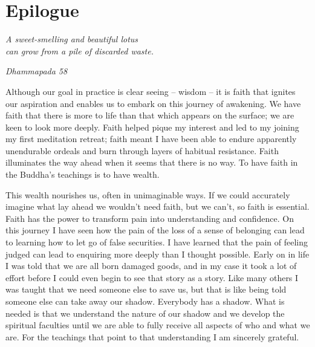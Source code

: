 \chapter{Epilogue}

\emph{A sweet-smelling and beautiful lotus\\
can grow from a pile of discarded waste.}

\emph{Dhammapada 58}

Although our goal in practice is clear seeing -- wisdom -- it is faith
that ignites our aspiration and enables us to embark on this journey of
awakening. We have faith that there is more to life than that which
appears on the surface; we are keen to look more deeply. Faith helped
pique my interest and led to my joining my first meditation retreat;
faith meant I have been able to endure apparently unendurable ordeals
and burn through layers of habitual resistance. Faith illuminates the
way ahead when it seems that there is no way. To have faith in the
Buddha's teachings is to have wealth.

This wealth nourishes us, often in unimaginable ways. If we could
accurately imagine what lay ahead we wouldn't need faith, but we can't,
so faith is essential. Faith has the power to transform pain into
understanding and confidence. On this journey I have seen how the pain
of the loss of a sense of belonging can lead to learning how to let go
of false securities. I have learned that the pain of feeling judged can
lead to enquiring more deeply than I thought possible. Early on in life
I was told that we are all born damaged goods, and in my case it took a
lot of effort before I could even begin to see that story as a story.
Like many others I was taught that we need someone else to save us, but
that is like being told someone else can take away our shadow. Everybody
has a shadow. What is needed is that we understand the nature of our
shadow and we develop the spiritual faculties until we are able to fully
receive all aspects of who and what we are. For the teachings that point
to that understanding I am sincerely grateful.

